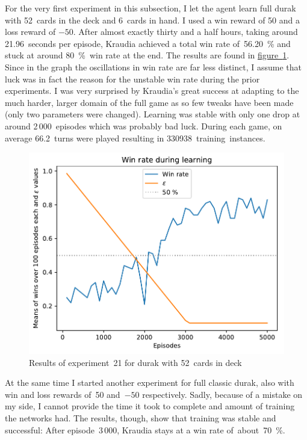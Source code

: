 \documentclass[a4paper,titlepage]{article}
\begin{document}
For the very first experiment in this subsection, I let the agent learn full durak with 52~cards in the deck and 6~cards in hand. I used a win reward of 50 and a loss reward of $-50$. After almost exactly thirty and a half hours, taking around 21.96~seconds per episode, Kraudia achieved a total win rate of~56.20~\% and stuck at around 80~\%~win rate at the end. The results are found in \hyperref[fig:exp21]{figure~\ref*{fig:exp21}}. Since in the graph the oscillations in win rate are far less distinct, I assume that luck was in fact the reason for the unstable win rate during the prior experiments. I was very surprised by Kraudia's great success at adapting to the much harder, larger domain of the full game as so few tweaks have been made (only two parameters were changed). Learning was stable with only one drop at around 2\,000~episodes which was probably bad luck. During each game, on average 66.2~turns were played resulting in 330938~training~instances.
\begin{figure}
  \centering
  \includegraphics[width=\textwidth]{../experiments/exp21/win_stats.pdf}
  \caption{Results of experiment~21 for durak with 52~cards in deck}
  \label{fig:exp21}
\end{figure}

At the same time I started another experiment for full classic durak, also with win and loss rewards of~50 and~$-50$ respectively. Sadly, because of a mistake on my side, I cannot provide the time it took to complete and amount of training the networks had. The results, though, show that training was stable and successful: After episode~3\,000, Kraudia stays at a win rate of~about~70~\%.
\end{document}

